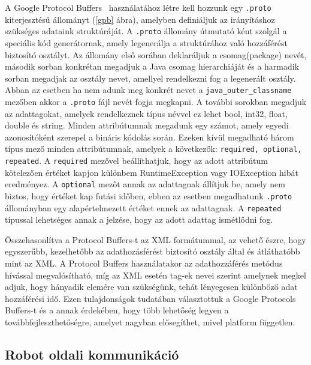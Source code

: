 A Google Protocol Buffers~\cite{protobuff} használatához létre kell hozzunk egy \texttt{.proto} kiterjesztésű állományt (\ref{gpb} ábra), amelyben definiáljuk az irányításhoz szükséges adataink struktúráját.
A \texttt{.proto} állomány útmutató ként szolgál a speciális kód generátornak, amely legenerálja a struktúrához való hozzáférést biztosító osztályt.
Az állomány első sorában deklaráljuk a csomag(package) nevét, második sorban konkrétan megadjuk a Java csomag hierarchiáját és a harmadik sorban megadjak az osztály nevet, amellyel rendelkezni fog a legenerált osztály. Abban az esetben ha nem adunk meg konkrét nevet a \texttt{java\_outer\_classname} mezőben akkor a \texttt{.proto} fájl nevét fogja megkapni. A további sorokban megadjuk az adattagokat, amelyek rendelkeznek típus névvel ez lehet bool, int32, float, double és string. Minden attribútumnak megadunk egy számot, amely egyedi azonosítóként szerepel a bináris kódolás során. Ezeken kívül megadható három típus mező minden attribútumnak, amelyek a következők: \texttt{required, optional, repeated}. A \texttt{required} mezővel beállíthatjuk, hogy az adott attribútum kötelezően értéket kapjon különbem RuntimeException vagy IOException hibát eredményez.  A \texttt{optional} mezőt annak az adattagnak állítjuk be, amely nem biztos, hogy értéket kap futási időben, ebben az esetben megadhatunk \texttt{.proto} állományban egy alapértelmezett értéket ennek az adattagnak. A \texttt{repeated} típussal lehetséges annak a jelzése, hogy az adott adattag ismétlődni fog.



Összehasonlítva a Protocol Buffers-t az XML formátummal, az vehető észre, hogy egyszerűbb, kezelhetőbb az adathozásférést biztosító osztály által és átláthatóbb mint az XML. A Protocol Buffers használatakor az adathozzáférés metódus hívással megvalósítható, míg az XML esetén tag-ek nevei szerint amelynek megkel adjuk, hogy hányadik elemére van szükségünk, tehát lényegesen különböző adat hozzáférési idő. Ezen tulajdonságok tudatában választottuk a Google Protocols Buffers-t és a annak érdekében, hogy több lehetőség legyen a  továbbfejleszthetőségre, amelyet nagyban elősegíthet, mivel platform független.

\subsection{Robot oldali kommunikáció}


